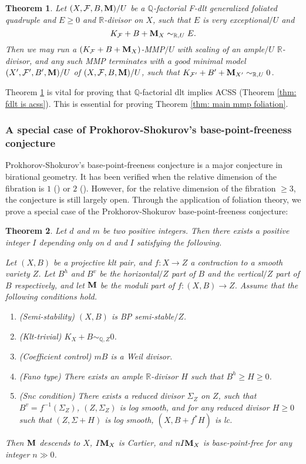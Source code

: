 \documentclass[11pt]{amsart}
\numberwithin{equation}{section}
\newcommand{\Mm}{{\bf{M}}}
\newcommand{\Qq}{\mathbb{Q}}
\newcommand{\Rr}{\mathbb{R}}
\newcommand{\Ff}{\mathcal{F}}
\newtheorem{thm}{Theorem}[subsection]
\theoremstyle{definition}
\theoremstyle{definition}
\theoremstyle{definition}
\begin{document}
\begin{thm}\label{thm: gfq mmp very exceptional intro}
    Let $(X,\Ff,B,\Mm)/U$ be a $\Qq$-factorial F-dlt generalized foliated quadruple and $E\geq 0$ and $\Rr$-divisor on $X$, such that $E$ is very exceptional$/U$ and
    $$K_{\Ff}+B+\Mm_X\sim_{\mathbb R,U}E.$$
    Then we may run a $(K_{\Ff}+B+\Mm_X)$-MMP$/U$ with scaling of an ample$/U$ $\Rr$-divisor, and any such MMP terminates with a good minimal model $(X',\Ff',B',\Mm)/U$ of $(X,\Ff,B,\Mm)/U$, such that $K_{\Ff'}+B'+\Mm_{X'}\sim_{\mathbb R,U}0$. 
\end{thm}
Theorem \ref{thm: gfq mmp very exceptional intro} is vital for proving that $\Qq$-factorial dlt implies ACSS (Theorem \ref{thm: fdlt is acss}). This is essential for proving Theorem \ref{thm: main mmp foliation}.

\subsubsection{A special case of Prokhorov-Shokurov's base-point-freeness conjecture}
Prokhorov-Shokurov's base-point-freeness conjecture \cite[Conjecture 7.13]{PS09} is a major conjecture in birational geometry. It has been verified when the relative dimension of the fibration is $1$ (\cite[Theorem 8.1]{PS09}) or $2$ (\cite[Theorem 1.4]{ABBDILW23}). However, for the relative dimension of the fibration $\geq 3$, the conjecture is still largely open. Through the application of foliation theory, we prove a special case of the Prokhorov-Shokurov base-point-freeness conjecture:
\begin{thm}\label{thm: ps intro}
Let $d$ and $m$ be two positive integers. Then there exists a positive integer $I$ depending only on $d$ and $I$ satisfying the following.
    
Let $(X,B)$ be a projective klt pair, and $f: X\rightarrow Z$ a contraction to a smooth variety $Z$. Let $B^h$ and $B^v$ be the horizontal$/Z$ part of $B$ and the vertical$/Z$ part of $B$ respectively, and let $\Mm$ be the moduli part of $f: (X,B)\rightarrow Z$. Assume that the following conditions hold.
    \begin{enumerate}
        \item (Semi-stability) $(X,B)$ is BP semi-stable$/Z$.
        \item (Klt-trivial) $K_X+B\sim_{\mathbb Q,Z}0$.
        \item (Coefficient control) $mB$ is a Weil divisor.
        \item (Fano type) There exists an ample $\Rr$-divisor $H$ such that $B^h\geq H\geq 0$.
        \item (Snc condition) There exists a reduced divisor $\Sigma_Z$ on $Z$, such that $B^v=f^{-1}(\Sigma_Z)$, $(Z,\Sigma_Z)$ is log smooth, and for any reduced divisor $H\geq 0$ such that $(Z,\Sigma+H)$ is log smooth, $(X,B+f^*H)$ is lc.
    \end{enumerate}
Then $\Mm$ descends to $X$, $I\Mm_X$ is Cartier, and $nI\Mm_X$ is base-point-free for any integer $n\gg 0$.
\end{thm}
\end{document}

